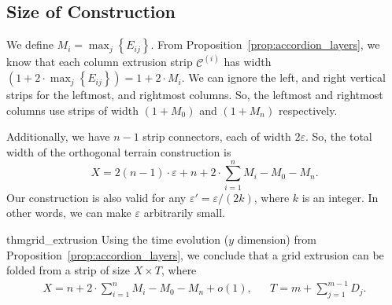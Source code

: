 \vspace{-1.5pc}
\subsection{Size of Construction}
\label{sec:size}

We define $M_i = \max_j\left\{ E_{ij}\right\}$.
From Proposition~\ref{prop:accordion_layers}, we know that each column extrusion strip
$\mathcal C^{(i)}$ has width $\left( 1 + 2\cdot\max_j\left\{ E_{ij}\right\}\right) = 1+2\cdot M_i$.
We can ignore the left, and right vertical strips for the leftmost, and rightmost columns.
So, the leftmost and rightmost columns use strips of width $(1 + M_0)$ and $(1 + M_n)$ respectively.

Additionally, we have $n-1$ strip connectors, each of width $2\varepsilon$.
So, the total width of the orthogonal terrain construction is
$$X = 2(n-1)\cdot\varepsilon + n + 2\cdot\sum\limits_{i=1}^n M_i - M_0 - M_n.$$
Our construction is also valid for any $\varepsilon' = \varepsilon/(2k)$, where $k$ is an integer.
In other words, we can make $\varepsilon$ arbitrarily small.

\begin{restatable}{thm}{grid_extrusion}
\label{thm:grid_extrusion}
Using the time evolution ($y$ dimension) from Proposition~\ref{prop:accordion_layers},
we conclude that a grid extrusion can be folded from a strip of size $X\times T$, where
\begin{align*}
X = n + 2\cdot\sum\limits_{i=1}^n M_i - M_0 - M_n + o(1), && T = m + \sum\limits^{m-1}_{j=1} D_j.
\end{align*}
\end{restatable}
\vspace{-1.5pc}
